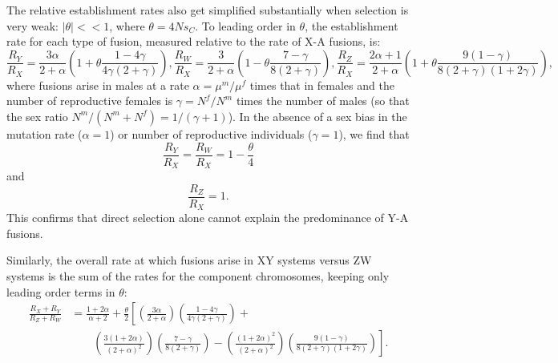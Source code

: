 The relative establishment rates also get simplified substantially when selection is very weak: $|\theta| << \text{1}$, where $\theta=\text{4}Ns_C$. To leading order in $\theta$, the establishment rate for each type of fusion, measured relative to the rate of X-A fusions, is:
\begin{subequations}
\begin{equation}
\frac{R_Y}{R_X} = \frac{\text{3}\alpha}{\text{2} +\alpha} \left(\text{1} + \theta \frac{\text{1} - \text{4}\gamma}{\text{4}\gamma(\text{2}+\gamma)} \right),
\end{equation}
\begin{equation}
\frac{R_W}{R_X} = \frac{\text{3}}{\text{2} +\alpha} \left(\text{1} - \theta \frac{\text{7} - \gamma}{\text{8}(\text{2}+\gamma)} \right),
\end{equation}
\begin{equation}
\frac{R_Z}{R_X} = \frac{\text{2}\alpha + \text{1}}{\text{2} +\alpha} \left(\text{1} + \theta \frac{\text{9}(\text{1} - \gamma)}{\text{8}(\text{2}+\gamma)(\text{1}+\text{2}\gamma)} \right),
\end{equation}
\end{subequations}
where fusions arise in males at a rate $\alpha=\mu^m/\mu^f$ times that in females and the number of reproductive females is $\gamma=N^f/N^m$ times the number of males (so that the sex ratio $N^m/(N^m + N^f) = \text{1}/(\gamma + 1)$). In the absence of a sex bias in the mutation rate ($\alpha=\text{1}$) or number of reproductive individuals ($\gamma=\text{1}$), we find that 
\[\frac{R_Y}{R_X}=\frac{R_W}{R_X}=\text{1} - \frac{\theta}{\text{4}} \]
and 
\[\frac{R_Z}{R_X} = \text{1}.\]
This confirms that direct selection alone cannot explain the predominance of Y-A fusions. 

Similarly, the overall rate at which fusions arise in XY systems versus ZW systems is the sum of the rates for the component chromosomes, keeping only leading order terms in $\theta$:
\begin{align}
\frac{R_X + R_Y}{R_Z + R_W} &= \frac{\text{1}+\text{2}\alpha}{\alpha + \text{2}} 
+ \frac{\theta}{\text{2}} \left[ \left(\frac{\text{3}\alpha}{\text{2} + \alpha} \right)
\left(\frac{\text{1}-\text{4}\gamma}{\text{4}\gamma(\text{2}+\gamma)}\right) +  \right. \nonumber \\
&\qquad \left.
\left(\frac{\text{3}(\text{1}+\text{2}\alpha)}{(\text{2}+\alpha)^\text{2}} \right)
\left(\frac{\text{7}-\gamma}{\text{8}(\text{2}+\gamma)} \right) - 
\left(\frac{(\text{1}+\text{2}\alpha)^\text{2}}{(\text{2}+\alpha)^\text{2}} \right)
\left(\frac{\text{9}(\text{1}-\gamma)}{\text{8}(\text{2}+\gamma)(\text{1}+\text{2}\gamma)} \right) \right].
\end{align}

